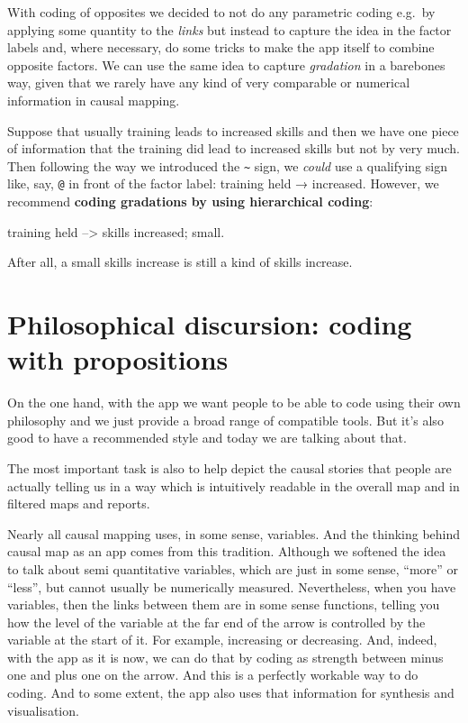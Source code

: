 \documentclass[
]{book}
\begin{document}
With coding of opposites we decided to not do any parametric coding e.g.~by applying some quantity to the \emph{links} but instead to capture the idea in the factor labels and, where necessary, do some tricks to make the app itself to combine opposite factors. We can use the same idea to capture \emph{gradation} in a barebones way, given that we rarely have any kind of very comparable or numerical information in causal mapping.

Suppose that usually training leads to increased skills and then we have one piece of information that the training did lead to increased skills but not by very much. Then following the way we introduced the \texttt{\textasciitilde{}} sign, we \emph{could} use a qualifying sign like, say, \texttt{@} in front of the factor label: training held → \citet{skills} increased. However, we recommend \textbf{coding gradations by using hierarchical coding}:

training held --\textgreater{} skills increased; small.

After all, a small skills increase is still a kind of skills increase.

\hypertarget{philosophical-discursion-coding-with-propositions}{%
\section{Philosophical discursion: coding with propositions}\label{philosophical-discursion-coding-with-propositions}}

On the one hand, with the app we want people to be able to code using their own philosophy and we just provide a broad range of compatible tools. But it's also good to have a recommended style and today we are talking about that.

The most important task is also to help depict the causal stories that people are actually telling us in a way which is intuitively readable in the overall map and in filtered maps and reports.

Nearly all causal mapping uses, in some sense, variables. And the thinking behind causal map as an app comes from this tradition. Although we softened the idea to talk about semi quantitative variables, which are just in some sense, ``more'' or ``less'', but cannot usually be numerically measured. Nevertheless, when you have variables, then the links between them are in some sense functions, telling you how the level of the variable at the far end of the arrow is controlled by the variable at the start of it. For example, increasing or decreasing. And, indeed, with the app as it is now, we can do that by coding as strength between minus one and plus one on the arrow. And this is a perfectly workable way to do coding. And to some extent, the app also uses that information for synthesis and visualisation.
\end{document}
